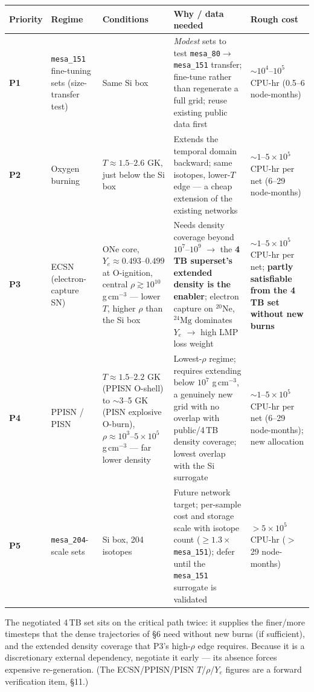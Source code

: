 \documentclass[11pt]{article}
\begin{document}
{\footnotesize\setlength{\tabcolsep}{4pt}
\begin{longtable}{p{0.9cm}p{2.2cm}p{3.6cm}p{4.8cm}p{2.9cm}}
\toprule
\textbf{Priority} & \textbf{Regime} & \textbf{Conditions} & \textbf{Why / data needed} & \textbf{Rough cost} \\
\midrule
\endhead
\textbf{P1} & \texttt{mesa\_151} fine-tuning sets (size-transfer test) & Same Si box & \emph{Modest} sets to test \texttt{mesa\_80}$\to$\texttt{mesa\_151} transfer; fine-tune rather than regenerate a full grid; reuse existing public data first & $\sim 10^4$--$10^5$ CPU-hr (0.5--6 node-months) \\
\textbf{P2} & Oxygen burning & $T \approx 1.5$--$2.6$ GK, just below the Si box & Extends the temporal domain backward; same isotopes, lower-$T$ edge --- a cheap extension of the existing networks & $\sim 1$--$5\times 10^5$ CPU-hr per net (6--29 node-months) \\
\textbf{P3} & ECSN (electron-capture SN) & ONe core, $Y_e \approx 0.493$--$0.499$ at O-ignition, central $\rho \gtrsim 10^{10}$ g\,cm$^{-3}$ --- lower $T$, higher $\rho$ than the Si box & Needs density coverage beyond $10^7$--$10^9$ $\to$ the \textbf{4\,TB superset's extended density is the enabler}; electron capture on ${}^{20}\mathrm{Ne}$, ${}^{24}\mathrm{Mg}$ dominates $Y_e$ $\to$ high LMP loss weight & $\sim 1$--$5\times 10^5$ CPU-hr per net; \textbf{partly satisfiable from the 4\,TB set without new burns} \\
\textbf{P4} & PPISN / PISN & $T \approx 1.5$--$2.2$ GK (PPISN O-shell) to $\sim$3--5 GK (PISN explosive O-burn), $\rho \approx 10^3$--$5\times 10^5$ g\,cm$^{-3}$ --- far lower density & Lowest-$\rho$ regime; requires extending below $10^7$ g\,cm$^{-3}$, a genuinely new grid with no overlap with public/4\,TB density coverage; lowest overlap with the Si surrogate & $\sim 1$--$5\times 10^5$ CPU-hr per net (6--29 node-months); new allocation \\
\textbf{P5} & \texttt{mesa\_204}-scale sets & Si box, 204 isotopes & Future network target; per-sample cost and storage scale with isotope count ($\ge 1.3\times$ \texttt{mesa\_151}); defer until the \texttt{mesa\_151} surrogate is validated & $> 5\times 10^5$ CPU-hr ($>$29 node-months) \\
\bottomrule
\end{longtable}}

The negotiated 4\,TB set sits on the critical path twice: it supplies the finer/more timesteps that the dense trajectories of \S6 need without new burns (if sufficient), and the extended density coverage that P3's high-$\rho$ edge requires. Because it is a discretionary external dependency, negotiate it early --- its absence forces expensive re-generation. (The ECSN/PPISN/PISN $T$/$\rho$/$Y_e$ figures are a forward verification item, \S11.)
\end{document}
